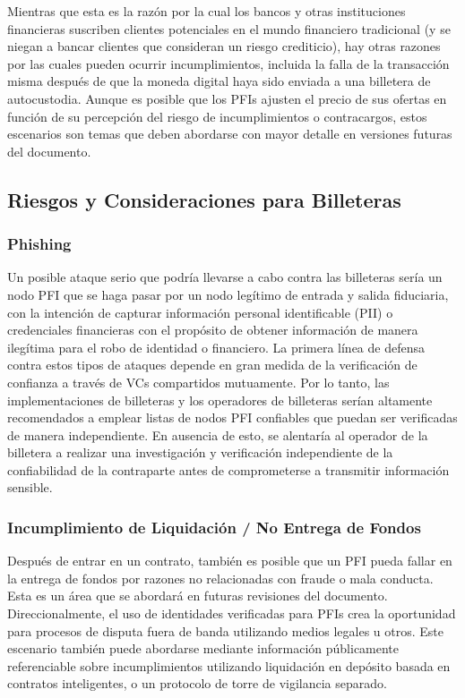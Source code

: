 \documentclass[11pt]{article}
\begin{document}
\vspace{1\baselineskip}
Mientras que esta es la razón por la cual los bancos y otras instituciones financieras suscriben clientes potenciales en el mundo financiero tradicional (y se niegan a bancar clientes que consideran un riesgo crediticio), hay otras razones por las cuales pueden ocurrir incumplimientos, incluida la falla de la transacción misma después de que la moneda digital haya sido enviada a una billetera de autocustodia. Aunque es posible que los PFIs ajusten el precio de sus ofertas en función de su percepción del riesgo de incumplimientos o contracargos, estos escenarios son temas que deben abordarse con mayor detalle en versiones futuras del documento.

\vspace{1\baselineskip}
\subsection{Riesgos y Consideraciones para Billeteras}

\subsubsection{Phishing}

Un posible ataque serio que podría llevarse a cabo contra las billeteras sería un nodo PFI que se haga pasar por un nodo legítimo de entrada y salida fiduciaria, con la intención de capturar información personal identificable (PII) o credenciales financieras con el propósito de obtener información de manera ilegítima para el robo de identidad o financiero. La primera línea de defensa contra estos tipos de ataques depende en gran medida de la verificación de confianza a través de VCs compartidos mutuamente. Por lo tanto, las implementaciones de billeteras y los operadores de billeteras serían altamente recomendados a emplear listas de nodos PFI confiables que puedan ser verificadas de manera independiente. En ausencia de esto, se alentaría al operador de la billetera a realizar una investigación y verificación independiente de la confiabilidad de la contraparte antes de comprometerse a transmitir información sensible.

\subsubsection{Incumplimiento de Liquidación / No Entrega de Fondos}

Después de entrar en un contrato, también es posible que un PFI pueda fallar en la entrega de fondos por razones no relacionadas con fraude o mala conducta. Esta es un área que se abordará en futuras revisiones del documento. Direccionalmente, el uso de identidades verificadas para PFIs crea la oportunidad para procesos de disputa fuera de banda utilizando medios legales u otros. Este escenario también puede abordarse mediante información públicamente referenciable sobre incumplimientos utilizando liquidación en depósito basada en contratos inteligentes, o un protocolo de torre de vigilancia separado. \ \ \ \ \ \ \ \ \ \ \ \ \ \ \ \ \ \ \ \ \ \ \ \ \ \ \ \ \ \ \ \ \ \ \ \ \ \ \ \ \ \ \ \ \ \ \ \ \ \ 
\end{document}
